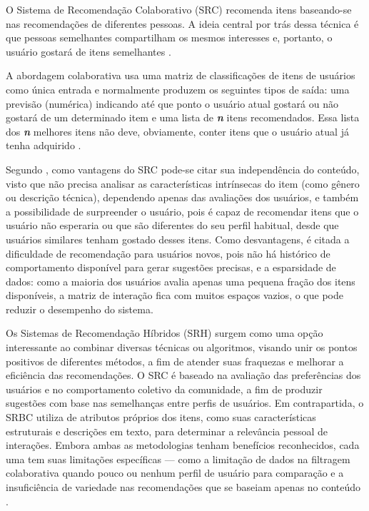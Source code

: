 O Sistema de Recomendação Colaborativo (SRC) recomenda itens baseando-se nas recomendações de diferentes pessoas. A ideia central por trás dessa técnica é que pessoas semelhantes compartilham os mesmos interesses e, portanto, o usuário gostará de itens semelhantes \cite{kumar2021recommender}.

A abordagem colaborativa usa uma matriz de classificações de itens de usuários como única entrada e normalmente produzem os seguintes tipos de saída: uma previsão (numérica) indicando até que ponto o usuário atual gostará ou não gostará de um determinado item e uma lista de \textbf{\textit{n}} itens recomendados. Essa lista dos \textbf{\textit{n}} melhores itens não deve, obviamente, conter itens que o usuário atual já tenha adquirido \cite{Jannach2011}. 

Segundo , como vantagens do SRC pode-se citar sua independência do conteúdo, visto que não precisa analisar as características intrínsecas do item (como gênero ou descrição técnica), dependendo apenas das avaliações dos usuários, e também a possibilidade de surpreender o usuário, pois é capaz de recomendar itens que o usuário não esperaria ou que são diferentes do seu perfil habitual, desde que usuários similares tenham gostado desses itens. Como desvantagens, é citada a dificuldade de recomendação para usuários novos, pois não há histórico de comportamento disponível para gerar sugestões precisas, e a esparsidade de dados: como a maioria dos usuários avalia apenas uma pequena fração dos itens disponíveis, a matriz de interação fica com muitos espaços vazios, o que pode reduzir o desempenho do sistema.

Os Sistemas de Recomendação Híbridos (SRH) surgem como uma opção interessante ao combinar diversas técnicas ou algoritmos, visando unir os pontos positivos de diferentes métodos, a fim de atender suas fraquezas e melhorar a eficiência das recomendações. O SRC é baseado na avaliação das preferências dos usuários e no comportamento coletivo da comunidade, a fim de produzir sugestões com base nas semelhanças entre perfis de usuários. Em contrapartida, o SRBC utiliza de atributos próprios dos itens, como suas características estruturais e descrições em texto, para determinar a relevância pessoal de interações. Embora ambas as metodologias tenham benefícios reconhecidos, cada uma tem suas limitações específicas — como a limitação de dados na filtragem colaborativa quando pouco ou nenhum perfil de usuário para comparação e a insuficiência de variedade nas recomendações que se baseiam apenas no conteúdo \cite{Jannach2011}.

